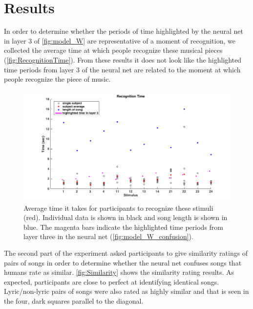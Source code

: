 \section{Results}
In order to determine whether the periods of time highlighted by the neural net in layer 3 of \autoref{fig:model_W} are representative of a moment of recognition, we collected the average time at which people recognize these musical pieces (\autoref{fig:RecognitionTime}). 
From these results it does not look like the highlighted time periods from layer 3 of the neural net are related to the moment at which people recognize the piece of music. 
\begin{figure}[h] 
  \begin{center}
        \includegraphics[scale=0.5]{Figures/RecognitionTimeGraph.png}
    \caption{Average time it takes for participants to recognize these stimuli (red). Individual data is shown in black and song length is shown in blue. The magenta bars indicate the highlighted time periods from layer three in the neural net (\autoref{fig:model_W_confusion}).}
    \label{fig:RecognitionTime}
  \end{center}
\end{figure}
The second part of the experiment asked participants to give similarity ratings of pairs of songs in order to determine whether the neural net confuses songs that humans rate as similar. 
\autoref{fig:Similarity} shows the similarity rating results. 
As expected, participants are close to perfect at identifying identical songs. 
Lyric/non-lyric pairs of songs were also rated as highly similar and that is seen in the four, dark squares parallel to the diagonal.

